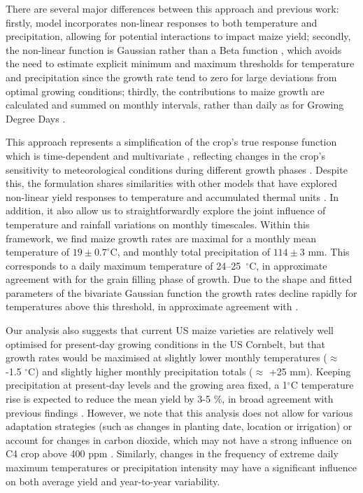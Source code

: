 \documentclass[12pt]{iopart}
\newcommand{\remove}[1]{}
\newcommand{\add}[1]{#1}
\begin{document}
\add{There are several major differences between this approach and previous work: firstly, model incorporates non-linear responses to both temperature and precipitation, allowing for potential interactions to impact maize yield; secondly, the non-linear function is Gaussian rather than a Beta function \citep[e.g.][]{yin:1995, streck:2007}, which avoids the need to estimate explicit minimum and maximum thresholds for temperature and precipitation since the growth rate tend to zero for large deviations from optimal growing conditions; thirdly, the contributions to maize growth are calculated and summed on monthly intervals, rather than daily as for Growing Degree Days \citep[e.g.][]{zhou:2018}.}

This approach represents a simplification of the crop's true response function which is time-dependent and multivariate \citep[e.g.][]{siebert:2017}, reflecting changes in the crop's sensitivity to meteorological conditions during different growth phases \citep[e.g.][]{hatfield:2011, sanchez:2014}. \add{Despite this, the formulation shares similarities with other models that have explored non-linear yield responses to temperature and accumulated thermal units \citep[e.g.][]{lobell:2013, zhou:2018}. In addition, it also allow us to straightforwardly explore the joint influence of temperature and rainfall variations on monthly timescales.} Within this framework, we find maize growth rates are maximal for a monthly mean temperature of $19 \pm 0.7 ^\circ$C, and monthly total precipitation of $ 114 \pm 3$ mm. This corresponds to a daily maximum temperature of 24--25~$^\circ$C, in approximate agreement with \cite{sanchez:2014, hatfield:2015} for the grain filling phase of growth. \remove{Furthermore,}\add{Due to the shape and fitted parameters of the bivariate Gaussian function} the growth rates decline rapidly for temperatures above this threshold, in approximate agreement with \cite{schlenker:2009}. 

Our analysis also suggests that current US maize varieties are relatively well optimised for present-day growing conditions in the US Cornbelt, but that growth rates would be maximised at slightly lower monthly temperatures ($\approx$ -1.5 $^\circ$C) and slightly higher monthly precipitation totals ($\approx$ +25 mm). Keeping precipitation at present-day levels and the growing area fixed, a 1$^\circ$C temperature rise is expected to reduce the mean yield by 3-5 \%, in broad agreement with previous findings \citep[e.g.][]{bassu:2014, urban:2015, lobell:2017}. However, we note that this analysis does not allow for various adaptation strategies (such as changes in planting date, location or irrigation) or account for changes in carbon dioxide, which may not have a strong influence on C4 crop above 400 ppm \citep[e.g.][]{leakey:2009}. Similarly, changes in the frequency of extreme daily maximum temperatures or precipitation intensity may have a significant influence on both average yield and year-to-year variability. 
\end{document}
